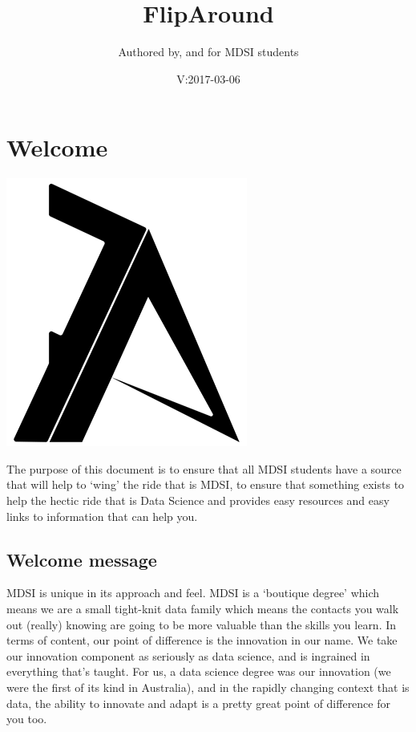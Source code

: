 \documentclass[]{book}
\title{FlipAround}
\author{Authored by, and for MDSI students}
\date{V:2017-03-06}
\theoremstyle{definition}
\theoremstyle{definition}
\theoremstyle{remark}
\begin{document}
\maketitle

{
\setcounter{tocdepth}{1}
\tableofcontents
}
\chapter{Welcome}\label{welcome}

\includegraphics{Images/FAlogo.png}

The purpose of this document is to ensure that all MDSI students have a
source that will help to `wing' the ride that is MDSI, to ensure that
something exists to help the hectic ride that is Data Science and
provides easy resources and easy links to information that can help you.

\section{Welcome message}\label{welcome-message}

MDSI is unique in its approach and feel. MDSI is a `boutique degree'
which means we are a small tight-knit data family which means the
contacts you walk out (really) knowing are going to be more valuable
than the skills you learn. In terms of content, our point of difference
is the innovation in our name. We take our innovation component as
seriously as data science, and is ingrained in everything that's taught.
For us, a data science degree was our innovation (we were the first of
its kind in Australia), and in the rapidly changing context that is
data, the ability to innovate and adapt is a pretty great point of
difference for you too.
\end{document}

